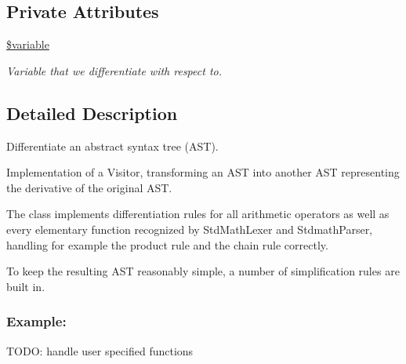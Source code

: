 \subsection*{Private Attributes}
\begin{DoxyCompactItemize}
\item 
\hypertarget{classMathParser_1_1Interpreting_1_1Differentiator_af3981989ecf9f68ac5fd5b78ad723910}{\hyperlink{classMathParser_1_1Interpreting_1_1Differentiator_af3981989ecf9f68ac5fd5b78ad723910}{\$variable}}\label{classMathParser_1_1Interpreting_1_1Differentiator_af3981989ecf9f68ac5fd5b78ad723910}

\begin{DoxyCompactList}\small\item\em Variable that we differentiate with respect to. \end{DoxyCompactList}\end{DoxyCompactItemize}


\subsection{Detailed Description}
Differentiate an abstract syntax tree (A\-S\-T). 

Implementation of a Visitor, transforming an A\-S\-T into another A\-S\-T representing the derivative of the original A\-S\-T.

The class implements differentiation rules for all arithmetic operators as well as every elementary function recognized by Std\-Math\-Lexer and Stdmath\-Parser, handling for example the product rule and the chain rule correctly.

To keep the resulting A\-S\-T reasonably simple, a number of simplification rules are built in.

\subsubsection*{Example\-:}




T\-O\-D\-O\-: handle user specified functions 

